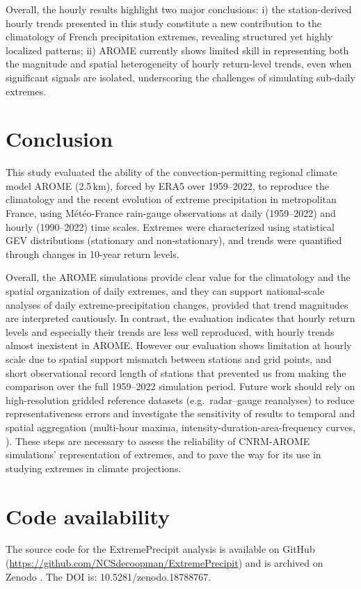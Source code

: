 \documentclass[hess, manuscript]{copernicus}
\begin{document}
Overall, the hourly results highlight two major conclusions: i) the station-derived hourly trends presented in this study constitute a new contribution to the climatology of French precipitation extremes, revealing structured yet highly localized patterns; ii) AROME currently shows limited skill in representing both the magnitude and spatial heterogeneity of hourly return-level trends, even when significant signals are isolated, underscoring the challenges of simulating sub-daily extremes.

\section{Conclusion}\label{conclusion}

This study evaluated the ability of the convection-permitting regional climate model AROME (2.5\,km), forced by ERA5 over 1959--2022, to reproduce the climatology and the recent evolution of extreme precipitation in metropolitan France, using Météo-France rain-gauge observations at daily (1959--2022) and hourly (1990--2022) time scales. Extremes were characterized using statistical GEV distributions (stationary and non-stationary), and trends were quantified through changes in 10-year return levels.

Overall, the AROME simulations provide clear value for the climatology and the spatial organization of daily extremes, and they can support national-scale analyses of daily extreme-precipitation changes, provided that trend magnitudes are interpreted cautiously. In contrast, the evaluation indicates that hourly return levels and especially their trends are less well reproduced, with hourly trends almost inexistent in AROME. However our evaluation shows limitation at hourly scale due to spatial support mismatch between stations and grid points, and short observational record length of stations that prevented us from making the comparison over the full 1959--2022 simulation period. Future work should rely on high-resolution gridded reference datasets (e.g.\ radar--gauge reanalyses) to reduce representativeness errors and investigate the sensitivity of results to temporal and spatial aggregation (multi-hour maxima, intensity-duration-area-frequency curves, \cite{haruna-etal-2024}). These steps are necessary to assess the reliability of CNRM-AROME simulations' representation of extremes, and to pave the way for its use in studying extremes in climate projections.

\section*{Code availability}
The source code for the ExtremePrecipit analysis is available on GitHub (\url{https://github.com/NCSdecoopman/ExtremePrecipit}) and is archived on Zenodo \citep{decoopman_zenodo_2026}. The DOI is: 10.5281/zenodo.18788767.
\end{document}
